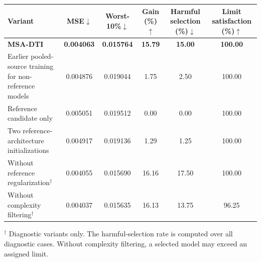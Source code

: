 \begin{center}
\begin{minipage}{\linewidth}

\label{tab:ablation}

\centering
\scriptsize
\renewcommand{\arraystretch}{1.08}
\setlength{\tabcolsep}{3.0pt}

\begin{tabular*}{\linewidth}{@{\extracolsep{\fill}}lccccc@{}}
\toprule

Variant
& MSE$\downarrow$
& Worst-10\%$\downarrow$
& Gain (\%)$\uparrow$
& \shortstack{Harmful selection\\(\%)$\downarrow$}
& \shortstack{Limit satisfaction\\(\%)$\uparrow$}
\\

\midrule

\textbf{MSA-DTI}
& \textbf{0.004063}
& \textbf{0.015764}
& \textbf{15.79}
& \textbf{15.00}
& \textbf{100.00}
\\

\shortstack[l]{Earlier pooled-source training\\for non-reference models}
& 0.004876
& 0.019044
& 1.75
& 2.50
& 100.00
\\

Reference candidate only
& 0.005051
& 0.019512
& 0.00
& 0.00
& 100.00
\\

Two reference-architecture initializations
& 0.004917
& 0.019136
& 1.29
& 1.25
& 100.00
\\

Without reference regularization$^{\dagger}$
& 0.004055
& 0.015690
& 16.16
& 17.50
& 100.00
\\

Without complexity filtering$^{\dagger}$
& 0.004037
& 0.015635
& 16.13
& 13.75
& 96.25
\\

\bottomrule
\end{tabular*}

\vspace{2pt}
\footnotesize

$^{\dagger}$ Diagnostic variants only.
The harmful-selection rate is computed over all diagnostic cases.
Without complexity filtering, a selected model may exceed an assigned
limit.

\end{minipage}
\end{center}
